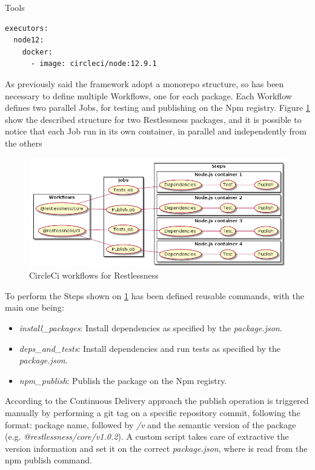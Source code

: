 \begin{chapter}{Tools}
    \bigskip
    \begin{lstlisting}[caption=Reusable executor definition, label={lst:ci_executor}]
executors:
  node12:
    docker:
      - image: circleci/node:12.9.1
    \end{lstlisting}
    As previously said the framework adopt a monorepo structure, so has been necessary
    to define multiple Workflows, one for each package. Each Workflow defines two
    parallel Jobs, for testing and publishing on the Npm registry.
    Figure \ref{fig:ci_workflow_diagram} show the described structure for two Restlessness
    packages, and it is possible to notice that each Job run in its own container,
    in parallel and independently from the others

    \begin{figure}
        \centering
        \includegraphics[width=\linewidth]{source/diagrams/ci_workflow.png}
        \caption{CircleCi workflows for Restlessness}
        \label{fig:ci_workflow_diagram}
    \end{figure}

    To perform the Steps shown on \ref{fig:ci_workflow_diagram} has been defined
    reusable commands, with the main one being:
    \begin{itemize}
        \item \textit{install\_packages}: Install dependencies as specified by the
            \textit{package.json}.
        \item \textit{deps\_and\_tests}: Install dependencies and run tests as
            specified by the \textit{package.json}.
        \item \textit{npm\_publish}: Publish the package on the Npm registry.
    \end{itemize}

    According to the Continuous Delivery approach the publish operation is triggered
    manually by performing a git tag on a specific repository commit, following the
    format: package name, followed by \textit{/v} and the semantic version of the
    package (e.g. \textit{@restlessness/core/v1.0.2}). A custom script takes care
    of extractive the version information and set it on the correct \textit{package.json},
    where is read from the npm publish command.


\end{chapter}
